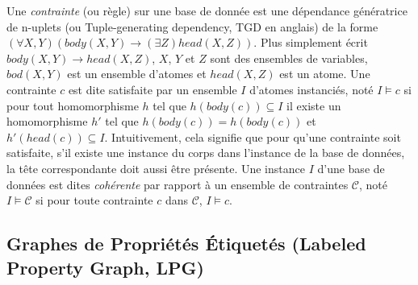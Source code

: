 Une \textit{contrainte} (ou règle) sur une base de donnée est une dépendance génératrice de n-uplets (ou Tuple-generating dependency, TGD en anglais) de la forme $(\forall X, Y)(body(X, Y) \to (\exists Z)head(X, Z))$.
Plus simplement écrit $body(X, Y) \to head(X, Z)$, $X$, $Y$ et $Z$ sont des ensembles de variables, $bod(X, Y)$ est un ensemble d'atomes et $head(X, Z)$ est un atome.
Une contrainte $c$ est dite satisfaite par un ensemble $I$ d'atomes instanciés, noté $I \vDash c$ si pour tout homomorphisme $h$ tel que $h(body(c)) \subseteq I$ il existe un homomorphisme $h'$ tel que $h(body(c)) = h(body(c))$ et $h'(head(c)) \subseteq I$.
Intuitivement, cela signifie que pour qu'une contrainte soit satisfaite, s'il existe une instance du corps dans l'instance de la base de données, la tête correspondante doit aussi être présente.
Une instance $I$ d'une base de données est dites \textit{cohérente} par rapport à un ensemble de contraintes $\mathcal{C}$, noté $I \vDash \mathcal{C}$ si pour toute contrainte $c$ dans $\mathcal{C}$, $I \vDash c$.

\subsection{Graphes de Propriétés Étiquetés (Labeled Property Graph, LPG)}

